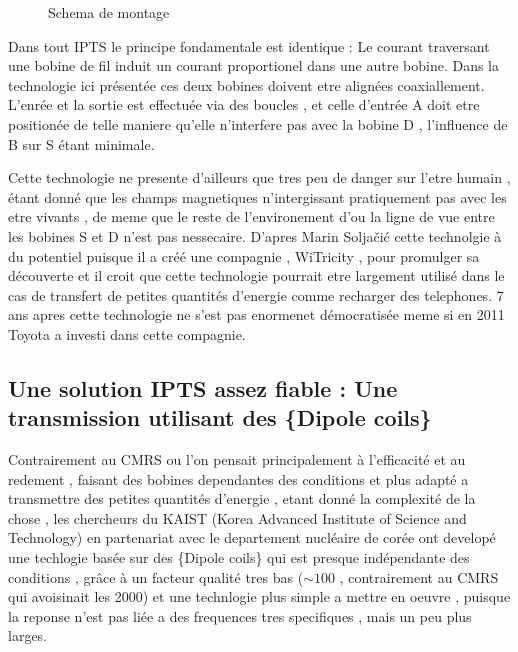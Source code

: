 \documentclass[12pt]{report}
\begin{document}
\begin{figure}
  \begin{center}
    \setlength\fboxsep{0pt}
    \setlength\fboxrule{0.5pt}
  \end{center}
  \caption{Schema de montage}
\end{figure} Dans tout IPTS le principe fondamentale est identique : Le courant traversant une bobine de fil induit un courant proportionel dans une autre bobine. Dans la technologie ici présentée ces deux bobines doivent etre alignées coaxiallement. L'enrée et la sortie est effectuée via des boucles , et celle d'entrée A doit etre positionée de telle maniere qu'elle n'interfere pas avec la bobine D , l'influence de B sur S étant minimale.

  Cette technologie ne presente d'ailleurs que tres peu de danger \cite{wiki1} sur l'etre humain , étant donné que les champs magnetiques n'intergissant pratiquement pas avec les etre vivants , de meme que le reste de l'environement d'ou la ligne de vue entre les bobines S et D n'est pas nessecaire.
 D'apres Marin Soljačić cette technolgie à du potentiel puisque il a créé une compagnie , WiTricity , pour promulger sa découverte et il croit que cette technologie pourrait etre largement utilisé dans le cas de transfert de petites quantités d'energie comme recharger des telephones. 7 ans apres cette technologie ne s'est pas enormenet démocratisée meme si en 2011 Toyota a investi dans cette compagnie.
\subsection{Une solution IPTS assez fiable : Une transmission utilisant des \{Dipole coils\}\cite{kaist14}}
Contrairement au CMRS ou l'on pensait principalement à l'efficacité et au redement , faisant des bobines dependantes des conditions et plus adapté a transmettre des petites quantités d'energie , etant donné la complexité de la chose , les chercheurs du KAIST (Korea Advanced Institute of Science and Technology) en partenariat avec le departement nucléaire de corée ont developé une techlogie basée sur des \{Dipole coils\} qui est presque indépendante des conditions , grâce à un facteur qualité tres bas (\(\sim100\) , contrairement au CMRS qui avoisinait les 2000) et une technlogie plus simple a mettre en oeuvre , puisque la reponse n'est pas liée a des frequences tres specifiques , mais un peu plus larges.
  
\end{document}
